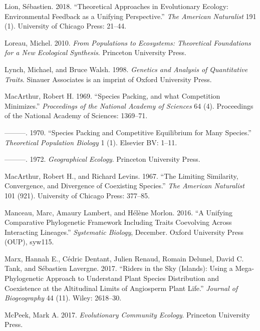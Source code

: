 \documentclass[]{article}
\begin{document}
\leavevmode\hypertarget{ref-Lion2018}{}%
Lion, Sébastien. 2018. ``Theoretical Approaches in Evolutionary Ecology:
Environmental Feedback as a Unifying Perspective.'' \emph{The American
Naturalist} 191 (1). University of Chicago Press: 21--44.

\leavevmode\hypertarget{ref-michelloreau2010}{}%
Loreau, Michel. 2010. \emph{From Populations to Ecosystems: Theoretical
Foundations for a New Ecological Synthesis}. Princeton University Press.

\leavevmode\hypertarget{ref-michaellynch1998}{}%
Lynch, Michael, and Bruce Walsh. 1998. \emph{Genetics and Analysis of
Quantitative Traits}. Sinauer Associates is an imprint of Oxford
University Press.

\leavevmode\hypertarget{ref-Arthur1969}{}%
MacArthur, Robert H. 1969. ``Species Packing, and what Competition
Minimizes.'' \emph{Proceedings of the National Academy of Sciences} 64
(4). Proceedings of the National Academy of Sciences: 1369--71.

\leavevmode\hypertarget{ref-MacArthur1970}{}%
---------. 1970. ``Species Packing and Competitive Equilibrium for Many
Species.'' \emph{Theoretical Population Biology} 1 (1). Elsevier BV:
1--11.

\leavevmode\hypertarget{ref-9780691023823}{}%
---------. 1972. \emph{Geographical Ecology}. Princeton University
Press.

\leavevmode\hypertarget{ref-Macarthur1967}{}%
MacArthur, Robert H., and Richard Levins. 1967. ``The Limiting
Similarity, Convergence, and Divergence of Coexisting Species.''
\emph{The American Naturalist} 101 (921). University of Chicago Press:
377--85.

\leavevmode\hypertarget{ref-Manceau2016}{}%
Manceau, Marc, Amaury Lambert, and Hélène Morlon. 2016. ``A Unifying
Comparative Phylogenetic Framework Including Traits Coevolving Across
Interacting Lineages.'' \emph{Systematic Biology}, December. Oxford
University Press (OUP), syw115.

\leavevmode\hypertarget{ref-Marx2017}{}%
Marx, Hannah E., Cédric Dentant, Julien Renaud, Romain Delunel, David C.
Tank, and Sébastien Lavergne. 2017. ``Riders in the Sky (Islands): Using
a Mega-Phylogenetic Approach to Understand Plant Species Distribution
and Coexistence at the Altitudinal Limits of Angiosperm Plant Life.''
\emph{Journal of Biogeography} 44 (11). Wiley: 2618--30.

\leavevmode\hypertarget{ref-markmcpeek2017}{}%
McPeek, Mark A. 2017. \emph{Evolutionary Community Ecology}. Princeton
University Press.
\end{document}
